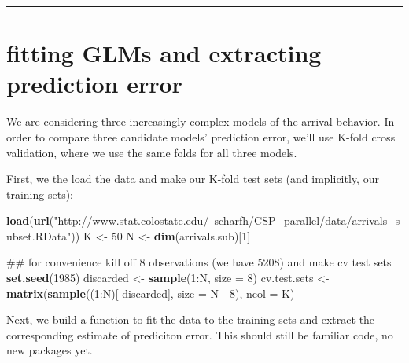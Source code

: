 \documentclass[]{article}
\newenvironment{Shaded}{\begin{snugshade}}{\end{snugshade}}
\newcommand{\KeywordTok}[1]{\textcolor[rgb]{0.13,0.29,0.53}{\textbf{{#1}}}}
\newcommand{\DataTypeTok}[1]{\textcolor[rgb]{0.13,0.29,0.53}{{#1}}}
\newcommand{\DecValTok}[1]{\textcolor[rgb]{0.00,0.00,0.81}{{#1}}}
\newcommand{\StringTok}[1]{\textcolor[rgb]{0.31,0.60,0.02}{{#1}}}
\newcommand{\NormalTok}[1]{{#1}}
\begin{document}
\begin{center}\rule{3in}{0.4pt}\end{center}

\section{fitting GLMs and extracting prediction
error}\label{fitting-glms-and-extracting-prediction-error}

We are considering three increasingly complex models of the arrival
behavior. In order to compare three candidate models' prediction error,
we'll use K-fold cross validation, where we use the same folds for all
three models.

First, we the load the data and make our K-fold test sets (and
implicitly, our training sets):

\begin{Shaded}
\begin{Highlighting}[]
\KeywordTok{load}\NormalTok{(}\KeywordTok{url}\NormalTok{(}\StringTok{"http://www.stat.colostate.edu/~scharfh/CSP_parallel/data/arrivals_subset.RData"}\NormalTok{))}
\NormalTok{K <-}\StringTok{ }\DecValTok{50}
\NormalTok{N <-}\StringTok{ }\KeywordTok{dim}\NormalTok{(arrivals.sub)[}\DecValTok{1}\NormalTok{]}

\NormalTok{## for convenience kill off 8 observations (we have 5208) and make cv test sets}
\KeywordTok{set.seed}\NormalTok{(}\DecValTok{1985}\NormalTok{)}
\NormalTok{discarded <-}\StringTok{ }\KeywordTok{sample}\NormalTok{(}\DecValTok{1}\NormalTok{:N, }\DataTypeTok{size =} \DecValTok{8}\NormalTok{)}
\NormalTok{cv.test.sets <-}\StringTok{ }\KeywordTok{matrix}\NormalTok{(}\KeywordTok{sample}\NormalTok{((}\DecValTok{1}\NormalTok{:N)[-discarded], }\DataTypeTok{size =} \NormalTok{N -}\StringTok{ }\DecValTok{8}\NormalTok{), }\DataTypeTok{ncol =} \NormalTok{K)}
\end{Highlighting}
\end{Shaded}

Next, we build a function to fit the data to the training sets and
extract the corresponding estimate of prediciton error. This should
still be familiar code, no new packages yet.
\end{document}

